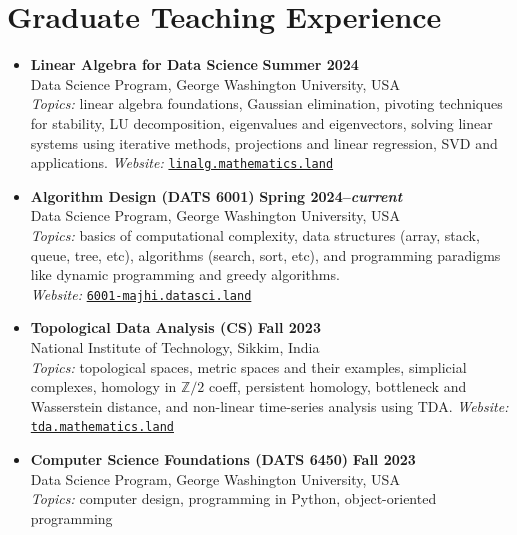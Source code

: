 \documentclass[11pt]{article}
\begin{document}

\section{Graduate Teaching Experience}
\begin{itemize}[leftmargin=*]

\item \textbf{Linear Algebra for Data Science} \hfill
  \textbf{\footnotesize Summer 2024}\\
  Data Science Program, George Washington University, USA \\
  \emph{Topics:} linear algebra foundations, Gaussian elimination, pivoting techniques for stability, LU decomposition, eigenvalues and eigenvectors,
  solving linear systems using iterative methods, projections and linear regression, SVD and applications.
  \emph{Website:} \href{https://linalg.mathematics.land/}{\tt linalg.mathematics.land}

\item \textbf{Algorithm Design (DATS 6001)} \hfill
  \textbf{\footnotesize Spring 2024--\emph{current}}\\
  Data Science Program, George Washington University, USA \\
  \emph{Topics:} basics of computational complexity, data structures (array,
  stack, queue, tree, etc), algorithms (search, sort, etc), and programming
  paradigms like dynamic programming and greedy algorithms.\\
    \emph{Website:} \href{https://6001-majhi.datasci.land/}{\tt 6001-majhi.datasci.land}

\item \textbf{Topological Data Analysis (CS)} \hfill
  \textbf{\footnotesize Fall 2023}\\
  National Institute of Technology, Sikkim, India \\
  \emph{Topics:} topological spaces, metric spaces and
  their examples, simplicial complexes, homology in $\mathbb Z/2$ coeff,
  persistent homology, bottleneck and Wasserstein distance, and non-linear
  time-series analysis using TDA. \emph{Website:} \href{https://tda.mathematics.land/}{\tt tda.mathematics.land}

\item \textbf{Computer Science Foundations (DATS 6450)} \hfill
  \textbf{\footnotesize Fall 2023}\\
  Data Science Program, George Washington University, USA \\
  \emph{Topics:} computer design, programming in Python, object-oriented programming


\end{itemize}
\end{document}
